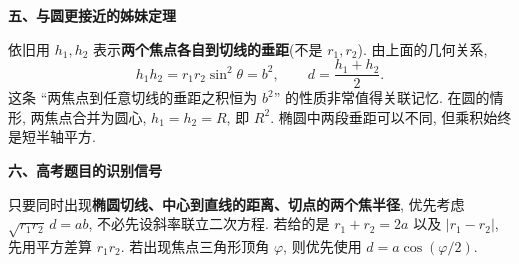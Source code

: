 \begin{explanationbox}
\textbf{五、与圆更接近的姊妹定理}

依旧用 $h_1,h_2$ 表示\textbf{两个焦点各自到切线的垂距}(不是 $r_1,r_2$).
由上面的几何关系,
\[
\boxed{h_1h_2=r_1r_2\sin^2\theta=b^2},
\qquad\boxed{d=\frac{h_1+h_2}{2}}.
\]
这条 ``两焦点到任意切线的垂距之积恒为 $b^2$'' 的性质非常值得关联记忆.
在圆的情形, 两焦点合并为圆心, $h_1=h_2=R$, 即 $R^2$.
椭圆中两段垂距可以不同, 但乘积始终是短半轴平方.

\textbf{六、高考题目的识别信号}

只要同时出现\textbf{椭圆切线、中心到直线的距离、切点的两个焦半径},
优先考虑 $\sqrt{r_1r_2}\,d=ab$, 不必先设斜率联立二次方程.
若给的是 $r_1+r_2=2a$ 以及 $|r_1-r_2|$, 先用平方差算 $r_1r_2$.
若出现焦点三角形顶角 $\varphi$, 则优先使用 $d=a\cos(\varphi/2)$.
\end{explanationbox}
